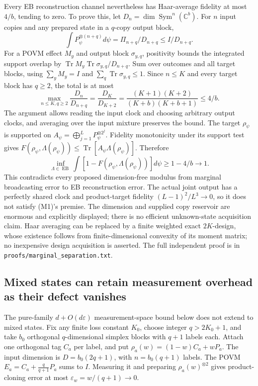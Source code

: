 \documentclass[11pt]{article}
\newcommand{\Tr}{\operatorname{Tr}}
\newcommand{\EB}{\operatorname{EB}}
\begin{document}
Every EB reconstruction channel nevertheless has Haar-average fidelity at most $4/b$, tending to zero. To prove this, let $D_n=\dim\operatorname{Sym}^n(\mathbb C^b)$. For $n$ input copies and any prepared state in a $q$-copy output block,
\[
\int P_\psi^{\otimes(n+q)}d\psi=\Pi_{n+q}/D_{n+q}\le I/D_{n+q}.
\]
For a POVM effect $M_y$ and output block $\sigma_{y,q}$, positivity bounds the integrated support overlap by $\Tr M_y\Tr\sigma_{y,q}/D_{n+q}$. Sum over outcomes and all target blocks, using $\sum_y M_y=I$ and $\sum_q\Tr\sigma_{y,q}\le1$. Since $n\le K$ and every target block has $q\ge2$, the total is at most
\[
\max_{n\le K,q\ge2}\frac{D_n}{D_{n+q}}
=\frac{D_K}{D_{K+2}}
=\frac{(K+1)(K+2)}{(K+b)(K+b+1)}\le4/b.
\]
The argument allows reading the input clock and choosing arbitrary output clocks, and averaging over the input mixture preserves the bound. The target $\rho_\psi$ is supported on $A_\psi=\bigoplus_{j=1}^LP_\psi^{\otimes2^j}$. Fidelity monotonicity under its support test gives $F(\rho_\psi,\Lambda(\rho_\psi))\le\Tr[A_\psi\Lambda(\rho_\psi)]$. Therefore
\[
\inf_{\Lambda\in\EB}\int[1-F(\rho_\psi,\Lambda(\rho_\psi))]d\psi
\ge1-4/b\longrightarrow1.
\tag{M10}
\]
This contradicts every proposed dimension-free modulus from marginal broadcasting error to EB reconstruction error. The actual joint output has a perfectly shared clock and product-target fidelity $(L-1)^2/L^3\to0$, so it does not satisfy (M1)'s premise. The dimension and supplied copy reservoir are enormous and explicitly displayed; there is no efficient unknown-state acquisition claim. Haar averaging can be replaced by a finite weighted exact $2K$-design, whose existence follows from finite-dimensional convexity of its moment matrix; no inexpensive design acquisition is asserted. The full independent proof is in \texttt{proofs/marginal\_separation.txt}.

\subsection{Mixed states can retain measurement overhead as their defect vanishes}

The pure-family $d+O(d\varepsilon)$ measurement-space bound below does not extend to mixed states. Fix any finite loss constant $K_0$, choose integer $q>2K_0+1$, and take $b_0$ orthogonal $q$-dimensional simplex blocks with $q+1$ labels each. Attach one orthogonal tag $C_a$ per label, and put $\rho_a(w)=(1-w)C_a+wP_a$. The input dimension is $D=b_0(2q+1)$, with $n=b_0(q+1)$ labels. The POVM $E_a=C_a+\frac q{q+1}P_a$ sums to $I$. Measuring it and preparing $\rho_a(w)^{\otimes2}$ gives product-cloning error at most $\varepsilon_w=w/(q+1)\to0$.
\end{document}
